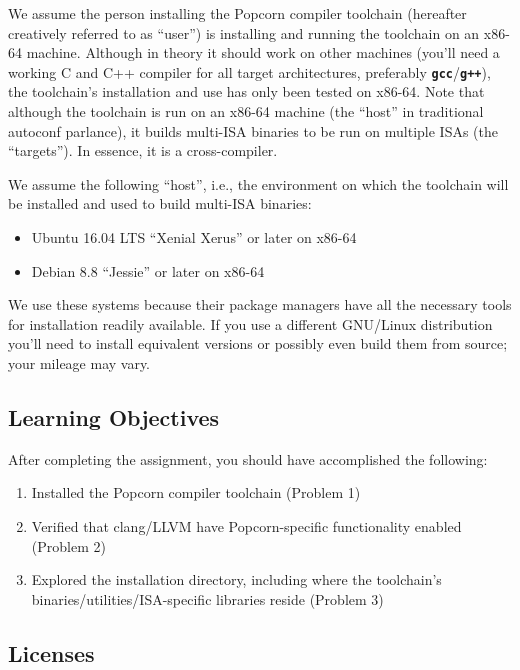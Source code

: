 \documentclass{article}
\newcommand{\prog}[1]{\texttt{\textbf{#1}}}
\begin{document}
We assume the person installing the Popcorn compiler toolchain (hereafter creatively referred to as ``user'') is installing and running the toolchain on an x86-64 machine.  Although in theory it should work on other machines (you'll need a working C and C++ compiler for all target architectures, preferably \prog{gcc}/\prog{g++}), the toolchain's installation and use has only been tested on x86-64.  Note that although the toolchain is run on an x86-64 machine (the ``host'' in traditional autoconf parlance), it builds multi-ISA binaries to be run on multiple ISAs (the ``targets'').  In essence, it is a cross-compiler.

We assume the following ``host'', i.e., the environment on which the toolchain will be installed and used to build multi-ISA binaries:

\begin{itemize}
	\item Ubuntu 16.04 LTS ``Xenial Xerus'' or later on x86-64
	\item Debian 8.8 ``Jessie'' or later on x86-64
\end{itemize}

We use these systems because their package managers have all the necessary tools for installation readily available.  If you use a different GNU/Linux distribution you'll need to install equivalent versions or possibly even build them from source; your mileage may vary.

\subsection{Learning Objectives}

After completing the assignment, you should have accomplished the following:

\begin{enumerate}
	\item Installed the Popcorn compiler toolchain (Problem 1)
	\item Verified that clang/LLVM have Popcorn-specific functionality enabled (Problem 2)
	\item Explored the installation directory, including where the toolchain's binaries/utilities/ISA-specific libraries reside (Problem 3)
\end{enumerate}

\subsection{Licenses}
\label{s:licenses}
\end{document}
